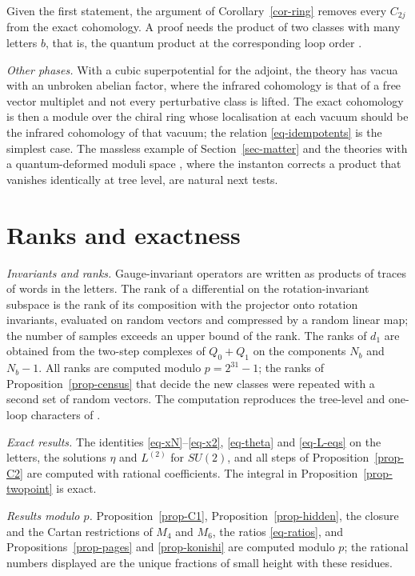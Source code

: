 \documentclass[11pt]{article}
\numberwithin{equation}{section}
\numberwithin{figure}{section}
\numberwithin{table}{section}
\theoremstyle{definition}
\begin{document}
Given the first statement, the argument of Corollary~\ref{cor-ring} removes every $C_{2j}$ from the exact cohomology. A proof needs the product of two classes with many letters $b$, that is, the quantum product at the corresponding loop order \cite{LLCh}.

\emph{Other phases.} With a cubic superpotential for the adjoint, the theory has vacua with an unbroken abelian factor, where the infrared cohomology is that of a free vector multiplet and not every perturbative class is lifted. The exact cohomology is then a module over the chiral ring whose localisation at each vacuum should be the infrared cohomology of that vacuum; the relation \eqref{eq-idempotents} is the simplest case. The massless example of Section~\ref{sec-matter} and the theories with a quantum-deformed moduli space \cite{Seiberg}, where the instanton corrects a product that vanishes identically at tree level, are natural next tests.

\appendix
\section{Ranks and exactness}\label{app-ranks}

\emph{Invariants and ranks.} Gauge-invariant operators are written as products of traces of words in the letters. The rank of a differential on the rotation-invariant subspace is the rank of its composition with the projector onto rotation invariants, evaluated on random vectors and compressed by a random linear map; the number of samples exceeds an upper bound of the rank. The ranks of $d_1$ are obtained from the two-step complexes of $Q_0+Q_1$ on the components $N_b$ and $N_b-1$. All ranks are computed modulo $p=2^{31}-1$; the ranks of Proposition~\ref{prop-census} that decide the new classes were repeated with a second set of random vectors. The computation reproduces the tree-level and one-loop characters of \cite[Table~2, Equations~(8.8), (8.9)]{semichiral}.

\emph{Exact results.} The identities \eqref{eq-xN}--\eqref{eq-x2}, \eqref{eq-theta} and \eqref{eq-L-eqs} on the letters, the solutions $\eta$ and $L^{(2)}$ for $SU(2)$, and all steps of Proposition~\ref{prop-C2} are computed with rational coefficients. The integral in Proposition~\ref{prop-twopoint} is exact.

\emph{Results modulo $p$.} Proposition~\ref{prop-C1}, Proposition~\ref{prop-hidden}, the closure and the Cartan restrictions of $M_4$ and $M_6$, the ratios \eqref{eq-ratios}, and Propositions~\ref{prop-pages} and \ref{prop-konishi} are computed modulo $p$; the rational numbers displayed are the unique fractions of small height with these residues.
\end{document}
